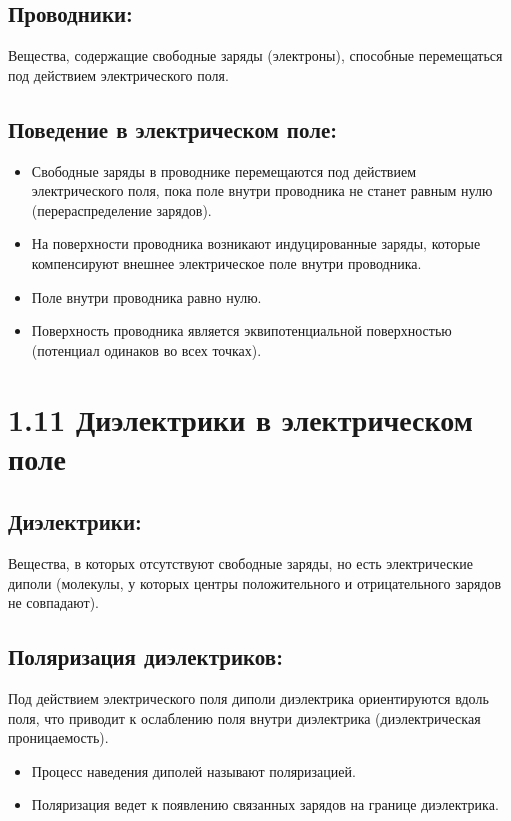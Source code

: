 \documentclass[a4paper,12pt]{article}
\begin{document}
\subsection*{Проводники:}
\vspace{-3pt}
Вещества, содержащие свободные заряды (электроны), способные перемещаться под действием электрического поля.

\vspace{-9pt}
\subsection*{Поведение в электрическом поле:}
\vspace{-3pt}
\begin{itemize} [itemsep=0pt, topsep=0pt, parsep=0pt]
  \item Свободные заряды в проводнике перемещаются под действием электрического поля, пока поле внутри проводника не станет равным нулю (перераспределение зарядов).
  \item На поверхности проводника возникают индуцированные заряды, которые компенсируют внешнее электрическое поле внутри проводника.
  \item Поле внутри проводника равно нулю.
  \item Поверхность проводника является эквипотенциальной поверхностью (потенциал одинаков во всех точках).
\end{itemize}


\section*{1.11 Диэлектрики в электрическом поле}
\vspace{-9pt}
\subsection*{Диэлектрики:}
\vspace{-3pt}
Вещества, в которых отсутствуют свободные заряды, но есть электрические диполи (молекулы, у которых центры положительного и отрицательного зарядов не совпадают).

\vspace{-9pt}
\subsection*{Поляризация диэлектриков:}
\vspace{-3pt}
Под действием электрического поля диполи диэлектрика ориентируются вдоль поля, что приводит к ослаблению поля внутри диэлектрика (диэлектрическая проницаемость).
\begin{itemize} [itemsep=0pt, topsep=0pt, parsep=0pt]
  \item Процесс наведения диполей называют поляризацией.
  \item Поляризация ведет к появлению связанных зарядов на границе диэлектрика.
\end{itemize}
\end{document}
